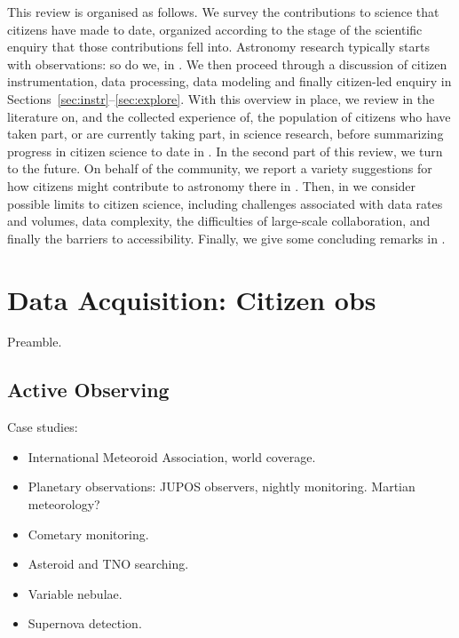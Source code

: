 \documentclass{ar2e}
\begin{document}
This review is organised as follows. We survey the contributions to science that
citizens have made to date, organized according to the stage of the scientific
enquiry that those contributions fell into. Astronomy research typically starts
with observations: so do we, in . We then proceed through a
discussion of citizen instrumentation, data processing, data modeling and
finally citizen-led enquiry in 
Sections~\ref{sec:instr}--\ref{sec:explore}. With this overview in place,
we review in  the literature on, and the collected experience
of, the population of citizens who have taken part, or are currently taking
part, in science research, before summarizing progress in citizen science to
date in . In the second part of this review, we turn to the
future. On behalf of the community, we report a variety suggestions for how
citizens might contribute to astronomy there in . Then, in 
 we consider possible limits to citizen science, including
challenges associated with data rates and volumes, data complexity, the
difficulties of large-scale collaboration, and finally the barriers to
accessibility. Finally, we give some concluding remarks in
.



\section{Data Acquisition: Citizen obs}
\label{sec:obs}

Preamble.


\subsection{Active Observing}
\label{sec:obs:active}

Case studies:
\begin{itemize}
\item International Meteoroid Association, world coverage.
\item Planetary observations: JUPOS observers, nightly monitoring. Martian meteorology?
\item Cometary monitoring.
\item Asteroid and TNO searching.
\item Variable nebulae.
\item Supernova detection.
\end{itemize}
\end{document}
